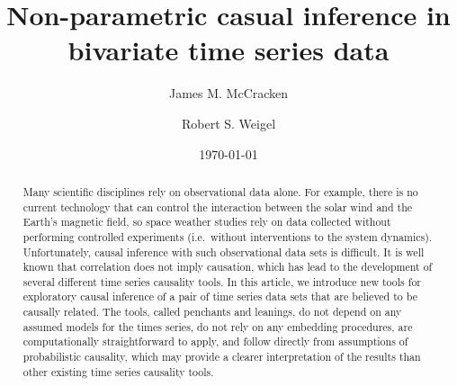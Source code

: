 \documentclass[a4paper,11pt,twocolumn]{article}
\begin{document}
\title{Non-parametric casual inference in bivariate time series data}
\author{James M. McCracken}
\author{Robert S. Weigel}
\date{\today}

\begin{abstract}
Many scientific disciplines rely on observational data alone.  For example, there is no current technology that can control the interaction between the solar wind and the Earth's magnetic field, so space weather studies rely on data collected without performing controlled experiments (i.e.\ without interventions to the system dynamics).  Unfortunately, causal inference with such observational data sets is difficult.  It is well known that correlation does not imply causation, which has lead to the development of several different time series causality tools.  In this article, we introduce new tools for exploratory causal inference of a pair of time series data sets that are believed to be causally related.  The tools, called penchants and leanings, do not depend on any assumed models for the times series, do not rely on any embedding procedures, are computationally straightforward to apply, and follow directly from assumptions of probabilistic causality, which may provide a clearer interpretation of the results than other existing time series causality tools.
\end{abstract}

\maketitle
\end{document}
